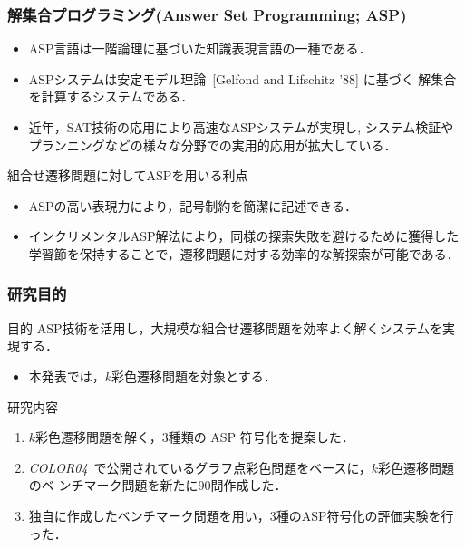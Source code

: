 \documentclass[dvipdfmx,11pt]{beamer}
\begin{document}
\begin{frame}\frametitle{解集合プログラミング(Answer Set Programming; ASP)}

  \begin{itemize}
    \item ASP言語は一階論理に基づいた知識表現言語の一種である．
    \item ASPシステムは安定モデル理論~[Gelfond and Lifschitz '88] に基づく
          解集合を計算するシステムである．
    \item 近年，SAT技術の応用により高速なASPシステムが実現し, 
          システム検証やプランニングなどの様々な分野での実用的応用が拡大している．
  \end{itemize}

  \begin{alertblock}{組合せ遷移問題に対してASPを用いる利点}
    \begin{itemize}
      \item ASPの高い表現力により，記号制約を簡潔に記述できる．
      \item インクリメンタルASP解法により，同様の探索失敗を避けるために獲得した学習節を保持することで，遷移問題に対する効率的な解探索が可能である．
    \end{itemize}
  \end{alertblock}
  
\end{frame}


\begin{frame}\frametitle{研究目的}
  \begin{alertblock}{目的}
    ASP技術を活用し，大規模な組合せ遷移問題を効率よく解くシステムを実現する．%
  \end{alertblock}
  \begin{itemize}
  \item 本発表では，$k$彩色遷移問題を対象とする．
  \end{itemize}
  \begin{block}{研究内容}
    \begin{enumerate}
    \item $k$彩色遷移問題を解く，3種類の ASP 符号化を提案した．
    \item \textit{COLOR04}~\footnotemark[1]
      で公開されているグラフ点彩色問題をベースに，$k$彩色遷移問題のベ
      ンチマーク問題を新たに90問作成した．
    \item 独自に作成したベンチマーク問題を用い，3種のASP符号化の評価実験を行った．
    \end{enumerate}
  \end{block}
\end{frame}
\end{document}
